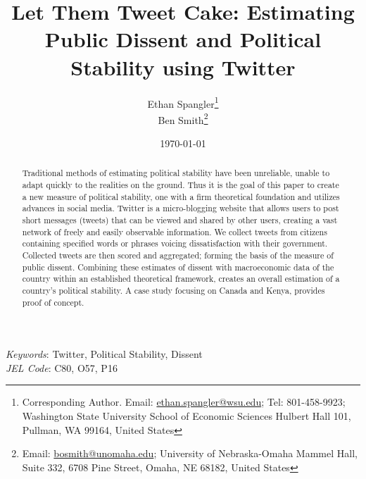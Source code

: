 \documentclass[12pt]{article}
\begin{document}
  


\begin{titlepage}




\title{Let Them Tweet Cake: Estimating Public Dissent and Political Stability using Twitter}



\author{Ethan Spangler\thanks{Corresponding Author. Email: {\href{mailto:ethan.spangler@wsu.edu}{ethan.spangler@wsu.edu}}; Tel: 801-458-9923; Washington State University School of Economic Sciences Hulbert Hall 101, Pullman, WA 99164, United States}  \\
Ben Smith\thanks{Email: {\href{mailto:bosmith@unomaha.edu}{bosmith@unomaha.edu}}; University of Nebraska-Omaha Mammel Hall, Suite 332, 6708 Pine Street, Omaha, NE 68182, United States}}



\date{\today}

\maketitle

\begin{abstract}
\noindent Traditional methods of estimating political stability have been unreliable, unable to adapt quickly to the realities on the ground. Thus it is the goal of this paper to create a new measure of political stability, one with a firm theoretical foundation and utilizes advances in social media. Twitter is a micro-blogging website that allows users to post short messages (tweets) that can be viewed and shared by other users, creating a vast network of freely and easily observable information. We collect tweets from citizens containing specified words or phrases voicing dissatisfaction with their government. Collected tweets are then scored and aggregated; forming the basis of the measure of public dissent. Combining these estimates of dissent with macroeconomic data of the country within an established theoretical framework, creates an overall estimation of a country's political stability. A case study focusing on Canada and Kenya, provides proof of concept.
\end{abstract}

\noindent \textit{Keywords}: Twitter, Political Stability, Dissent \\

\noindent \textit{JEL Code}: C80, O57, P16




\end{titlepage}
\end{document}
